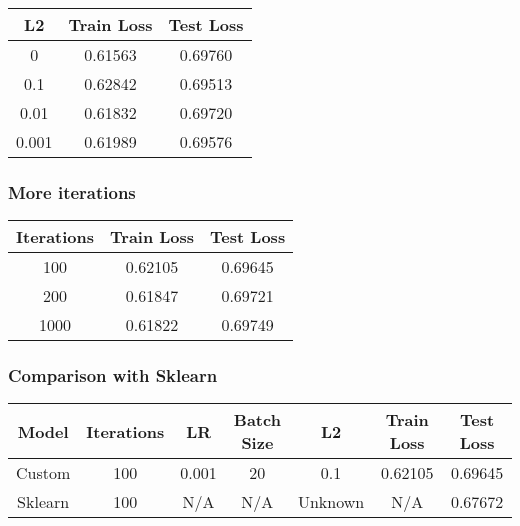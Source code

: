 \documentclass[
	letterpaper, %
	10pt, %
]{class}
\begin{document}
\begin{center}
	\begin{tabular}{ |c|c|c| }
		\hline
		L2    & Train Loss & Test Loss \\
		\hline
		0     & 0.61563    & 0.69760   \\
		0.1   & 0.62842    & 0.69513   \\
		0.01  & 0.61832    & 0.69720   \\
		0.001 & 0.61989    & 0.69576   \\
		\hline
	\end{tabular}
\end{center}

\subsubsection{More iterations}

\begin{center}
	\begin{tabular}{ |c|c|c| }
		\hline
		Iterations & Train Loss & Test Loss \\
		\hline
		100        & 0.62105    & 0.69645   \\
		200        & 0.61847    & 0.69721   \\
		1000       & 0.61822    & 0.69749   \\
		\hline
	\end{tabular}
\end{center}

\subsubsection{Comparison with Sklearn}

\begin{center}
	\begin{tabular}{ |c|c|c|c|c|c|c| }
		\hline
		Model   & Iterations & LR    & Batch Size & L2      & Train Loss & Test Loss \\
		\hline
		Custom  & 100        & 0.001 & 20         & 0.1     & 0.62105    & 0.69645   \\
		Sklearn & 100        & N/A   & N/A        & Unknown & N/A        & 0.67672   \\
		\hline
	\end{tabular}
\end{center}
\end{document}

